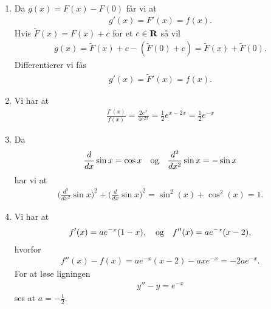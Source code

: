\begin{enumerate}
	
	\item Da $g(x)=F(x)-F(0)$ får vi at
	\begin{align*}
	g'(x)=F'(x)=f(x).
	\end{align*}
	Hvis $\tilde{F}(x)=F(x)+c$ for et $c\in \mathbf{R}$ så vil
	\begin{align*}
	g(x)=\tilde{F}(x)+c-(\tilde{F}(0)+c)=\tilde{F}(x)+\tilde{F}(0).
	\end{align*}
	Differentierer vi fås
	\begin{align*}
	g'(x)=\tilde{F}'(x)=f(x).
	\end{align*}
	
	\item Vi har at
	\begin{align*}
	\frac{f'(x)}{f(x)}=\frac{2e^x}{4e^{2x}}=\frac{1}{2}e^{x-2x}=\frac{1}{2}e^{-x}
	\end{align*}
		
	
	
	\item Da
	\begin{align*}
	\frac{d}{dx} \sin x=\cos x\quad \textup{og} \quad \frac{d^2}{dx^2}\sin x=-\sin x
	\end{align*}
	har vi at
	\begin{align*}
	\Big(\frac{d^2}{dx^2}\sin x\Big)^2+\Big(\frac{d}{dx}\sin x\Big)^2=\sin^2(x)+\cos^2(x)=1.
	\end{align*}

	\item Vi har at
	\begin{align*}
	f'(x)=ae^{-x}(1-x),\quad \textup{og} \quad f''(x)=ae^{-x}(x-2),
	\end{align*}
	hvorfor 
	\begin{align*}
	f''(x)-f(x)=ae^{-x}(x-2)-axe^{-x}=-2ae^{-x}.
	\end{align*}
	For at løse ligningen
	\begin{align*}
	y''-y=e^{-x}
	\end{align*}
	ses at $a=-\frac{1}{2}$.
	
\end{enumerate}